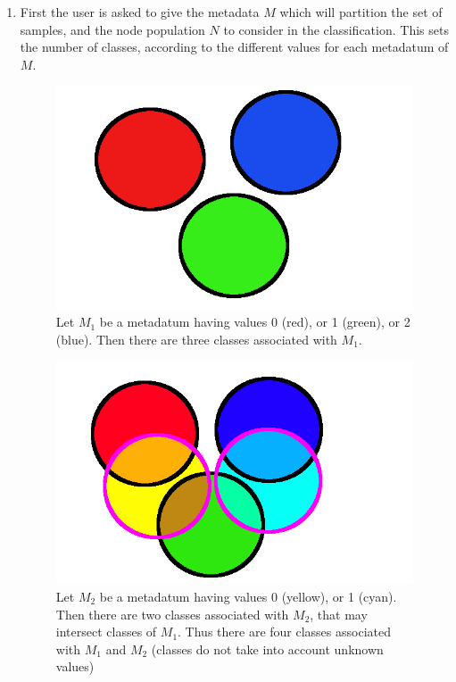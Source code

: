 \documentclass{report}
\begin{document}
\begin{enumerate}
\item First the user is asked to give the metadata $M$ which will partition the set of samples, and the node population $N$ to consider in the classification. This sets the number of classes, according to the different values for each metadatum of $M$.

\begin{figure}[H]
\centering
\includegraphics[scale=0.3]{illustrations/classessimples.png}
\caption{Let $M_1$ be a metadatum having values 0 (red), or 1 (green), or 2 (blue). Then there are three classes associated with $M_1$.}
\end{figure}

\begin{figure}[H]
\centering
\includegraphics[scale=0.3]{illustrations/classescomplexes.png}
\caption{Let $M_2$ be a metadatum having values 0 (yellow), or 1 (cyan). Then there are two classes associated with $M_2$, that may intersect classes of $M_1$. Thus there are four classes associated with $M_1$ and $M_2$ (classes do not take into account unknown values)}
\end{figure}


\end{enumerate}
\end{document}
